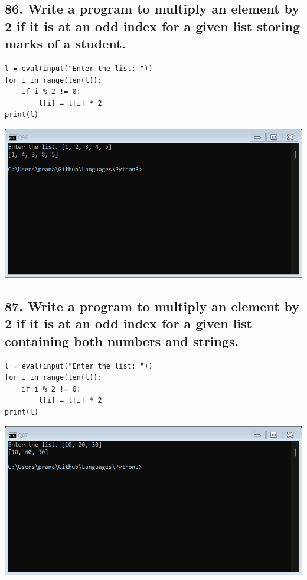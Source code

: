 \documentclass[12pt]{article}
\begin{document}
\subsection*{86. Write a program to multiply an element by 2 if it is at an odd index for a given list storing marks of a student.}
\begin{verbatim}
l = eval(input("Enter the list: "))
for i in range(len(l)):
    if i % 2 != 0:
        l[i] = l[i] * 2
print(l)
\end{verbatim}
\includegraphics[width=\linewidth]{images/86.png}

\subsection*{87. Write a program to multiply an element by 2 if it is at an odd index for a given list containing both numbers and strings.}
\begin{verbatim}
l = eval(input("Enter the list: "))
for i in range(len(l)):
    if i % 2 != 0:
        l[i] = l[i] * 2
print(l)
\end{verbatim}
\includegraphics[width=\linewidth]{images/87.png}
\end{document}
